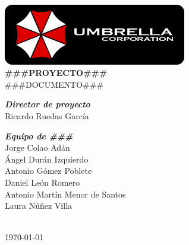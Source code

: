\documentclass[a4paper,11pt,oneside]{article}
\begin{document}
\renewcommand\listtablename{Índice de tablas}
\renewcommand\tablename{Tabla}

\pagestyle{plain}



\begin{titlepage}
\begin{center}

\includegraphics[width=0.6\textwidth]{logo-umbrella.png}\\[4cm]

{\huge \textbf{\#\#\#PROYECTO\#\#\#}}\\[0.5cm]
{\huge {\#\#\#DOCUMENTO\#\#\#}}\\[4cm]

\begin{minipage}{0.5\textwidth}
\large
\hspace{1cm}\textbf{\emph{Director de proyecto}}\\
Ricardo Ruedas García\\
\end{minipage}

\begin{minipage}{0.5\textwidth}
\large
\hspace{1cm}\textbf{\emph{Equipo de \#\#\#}}\\
Jorge Colao Adán\\
Ángel Durán Izquierdo\\
Antonio Gómez Poblete\\
Daniel León Romero\\
Antonio Martín Menor de Santos\\
Laura Núñez Villa\\
\end{minipage}\\[2cm]

{\Large \today}
\end{center}
\end{titlepage}


\clearpage
{}
\setcounter{page}{2}

\tableofcontents

\clearpage

\pagestyle{fancy}















\end{document}
